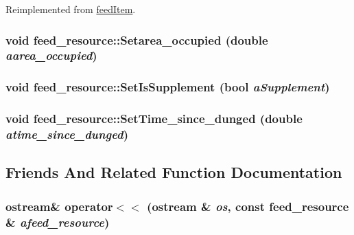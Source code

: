 Reimplemented from \hyperlink{classfeed_item_aff5b258f8da3b96282898cb9fa685c2f}{feedItem}.\hypertarget{classfeed__resource_ada9004283f3b592ee9eaebbdfc197190}{
\subsubsection[{Setarea\_\-occupied}]{\setlength{\rightskip}{0pt plus 5cm}void feed\_\-resource::Setarea\_\-occupied (double {\em aarea\_\-occupied})}}
\label{classfeed__resource_ada9004283f3b592ee9eaebbdfc197190}
\hypertarget{classfeed__resource_a94266da551778acc0c29f514e161ac50}{
\subsubsection[{SetIsSupplement}]{\setlength{\rightskip}{0pt plus 5cm}void feed\_\-resource::SetIsSupplement (bool {\em aSupplement})}}
\label{classfeed__resource_a94266da551778acc0c29f514e161ac50}
\hypertarget{classfeed__resource_aa4e28811ee99f8445de3b899b6613137}{
\subsubsection[{SetTime\_\-since\_\-dunged}]{\setlength{\rightskip}{0pt plus 5cm}void feed\_\-resource::SetTime\_\-since\_\-dunged (double {\em atime\_\-since\_\-dunged})}}
\label{classfeed__resource_aa4e28811ee99f8445de3b899b6613137}


\subsection{Friends And Related Function Documentation}
\hypertarget{classfeed__resource_aac858c94a22c316b401e81352546407e}{
\subsubsection[{operator$<$$<$}]{\setlength{\rightskip}{0pt plus 5cm}ostream\& operator$<$$<$ (ostream \& {\em os}, \/  const {\bf feed\_\-resource} \& {\em afeed\_\-resource})}}
\label{classfeed__resource_aac858c94a22c316b401e81352546407e}


